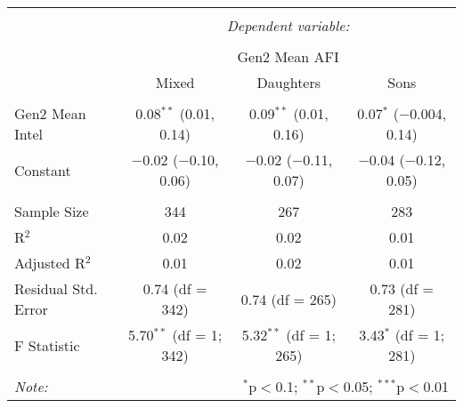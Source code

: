 
\begingroup 
\small 
\begin{tabular}{@{\extracolsep{1pt}}lccc} 
\\[-1.8ex]\hline 
\hline \\[-1.8ex] 
 & \multicolumn{3}{c}{\textit{Dependent variable:}} \\ 
\cline{2-4} 
\\[-1.8ex] & \multicolumn{3}{c}{Gen2 Mean AFI} \\ 
 & Mixed & Daughters & Sons \\ 
\hline \\[-1.8ex] 
 Gen2 Mean Intel & 0.08$^{**}$ (0.01, 0.14) & 0.09$^{**}$ (0.01, 0.16) & 0.07$^{*}$ ($-$0.004, 0.14) \\ 
  Constant & $-$0.02 ($-$0.10, 0.06) & $-$0.02 ($-$0.11, 0.07) & $-$0.04 ($-$0.12, 0.05) \\ 
 \hline \\[-1.8ex] 
Sample Size & 344 & 267 & 283 \\ 
R$^{2}$ & 0.02 & 0.02 & 0.01 \\ 
Adjusted R$^{2}$ & 0.01 & 0.02 & 0.01 \\ 
Residual Std. Error & 0.74 (df = 342) & 0.74 (df = 265) & 0.73 (df = 281) \\ 
F Statistic & 5.70$^{**}$ (df = 1; 342) & 5.32$^{**}$ (df = 1; 265) & 3.43$^{*}$ (df = 1; 281) \\ 
\hline 
\hline \\[-1.8ex] 
\textit{Note:}  & \multicolumn{3}{r}{$^{*}$p$<$0.1; $^{**}$p$<$0.05; $^{***}$p$<$0.01} \\ 
\end{tabular} 
\endgroup 
